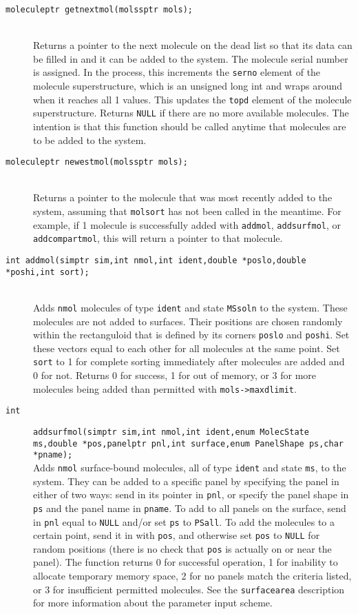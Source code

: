 \documentclass {scrbook}
\newcommand {\ttt} {\texttt}
\begin{document}
\begin{description}
\item[\ttt{moleculeptr getnextmol(molssptr mols);}]
\hfill \\
Returns a pointer to the next molecule on the dead list so that its data can be filled in and it can be added to the system. The molecule serial number is assigned. In the process, this increments the \ttt{serno} element of the molecule superstructure, which is an unsigned long int and wraps around when it reaches all 1 values. This updates the \ttt{topd} element of the molecule superstructure. Returns \ttt{NULL} if there are no more available molecules. The intention is that this function should be called anytime that molecules are to be added to the system.

\item[\ttt{moleculeptr newestmol(molssptr mols);}]
\hfill \\
Returns a pointer to the molecule that was most recently added to the system, assuming that \ttt{molsort} has not been called in the meantime. For example, if 1 molecule is successfully added with \ttt{addmol}, \ttt{addsurfmol}, or \ttt{addcompartmol}, this will return a pointer to that molecule.

\item[\ttt{int addmol(simptr sim,int nmol,int ident,double *poslo,double *poshi,int sort);}]
\hfill \\
Adds \ttt{nmol} molecules of type \ttt{ident} and state \ttt{MSsoln} to the system. These molecules are not added to surfaces. Their positions are chosen randomly within the rectanguloid that is defined by its corners \ttt{poslo} and \ttt{poshi}. Set these vectors equal to each other for all molecules at the same point. Set \ttt{sort} to 1 for complete sorting immediately after molecules are added and 0 for not. Returns 0 for success, 1 for out of memory, or 3 for more molecules being added than permitted with \ttt{mols->maxdlimit}.

\item[\ttt{int}]
\ttt{addsurfmol(simptr sim,int nmol,int ident,enum MolecState ms,double *pos,panelptr pnl,int surface,enum PanelShape ps,char *pname);} \\
Adds \ttt{nmol} surface-bound molecules, all of type \ttt{ident} and state \ttt{ms}, to the system. They can be added to a specific panel by specifying the panel in either of two ways: send in its pointer in \ttt{pnl}, or specify the panel shape in \ttt{ps} and the panel name in \ttt{pname}. To add to all panels on the surface, send in \ttt{pnl} equal to \ttt{NULL} and/or set \ttt{ps} to \ttt{PSall}. To add the molecules to a certain point, send it in with \ttt{pos}, and otherwise set \ttt{pos} to \ttt{NULL} for random positions (there is no check that \ttt{pos} is actually on or near the panel). The function returns 0 for successful operation, 1 for inability to allocate temporary memory space, 2 for no panels match the criteria listed, or 3 for insufficient permitted molecules. See the \ttt{surfacearea} description for more information about the parameter input scheme.


\end{description}
\end{document}
